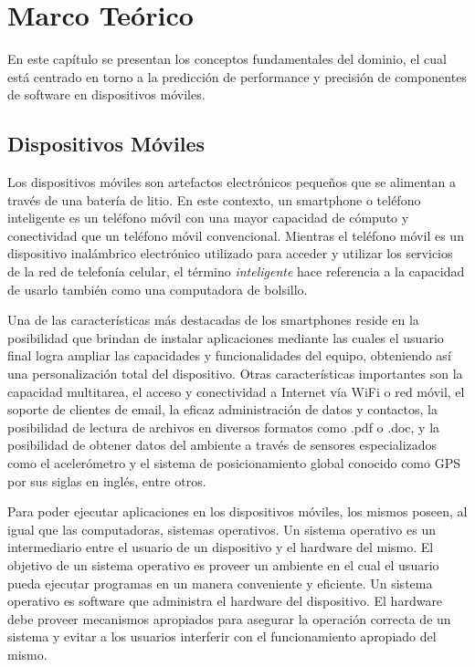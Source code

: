 
\chapter{Marco Teórico\label{chap:Marco-Teorico}}

En este capítulo se presentan los conceptos fundamentales del dominio,
el cual está centrado en torno a la predicción de performance y precisión
de componentes de software en dispositivos móviles.


\section{Dispositivos Móviles\label{sec:Dispositivos-m=0000F3viles}}

Los dispositivos móviles son artefactos electrónicos pequeños que
se alimentan a través de una batería de litio. En este contexto, un
smartphone o teléfono inteligente es un teléfono móvil con una mayor
capacidad de cómputo y conectividad que un teléfono móvil convencional.
Mientras el teléfono móvil es un dispositivo inalámbrico electrónico
utilizado para acceder y utilizar los servicios de la red de telefonía
celular, el término \emph{inteligente} hace referencia a la capacidad
de usarlo también como una computadora de bolsillo.

Una de las características más destacadas de los smartphones reside
en la posibilidad que brindan de instalar aplicaciones mediante las
cuales el usuario final logra ampliar las capacidades y funcionalidades
del equipo, obteniendo así una personalización total del dispositivo.
Otras características importantes son la capacidad multitarea, el
acceso y conectividad a Internet vía WiFi o red móvil, el soporte
de clientes de email, la eficaz administración de datos y contactos,
la posibilidad de lectura de archivos en diversos formatos como .pdf
o .doc, y la posibilidad de obtener datos del ambiente a través de
sensores especializados como el acelerómetro y el sistema de posicionamiento
global conocido como GPS por sus siglas en inglés, entre otros. 

Para poder ejecutar aplicaciones en los dispositivos móviles, los
mismos poseen, al igual que las computadoras, sistemas operativos.
Un sistema operativo es un intermediario entre el usuario de un dispositivo
y el hardware del mismo. El objetivo de un sistema operativo es proveer
un ambiente en el cual el usuario pueda ejecutar programas en un manera
conveniente y eficiente. Un sistema operativo es software que administra
el hardware del dispositivo. El hardware debe proveer mecanismos apropiados
para asegurar la operación correcta de un sistema y evitar a los usuarios
interferir con el funcionamiento apropiado del mismo. 

